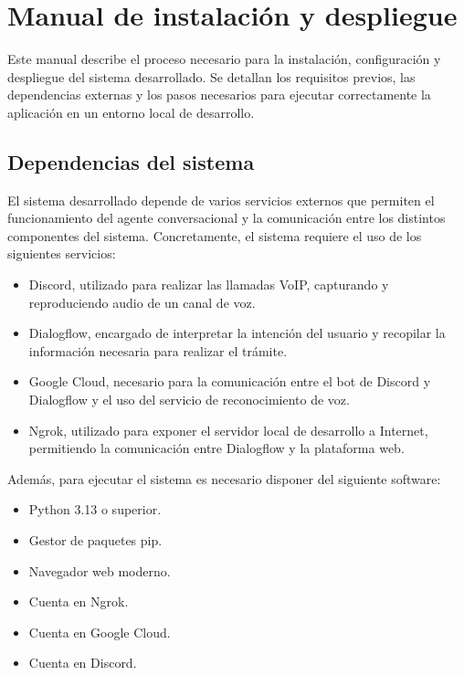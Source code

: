 \section{Manual de instalación y despliegue}

    Este manual describe el proceso necesario para la instalación, configuración y despliegue del sistema desarrollado. 
    Se detallan los requisitos previos, las dependencias externas y los pasos necesarios para ejecutar correctamente la aplicación en un entorno local de desarrollo. 

    \subsection{Dependencias del sistema}
        El sistema desarrollado depende de varios servicios externos que permiten el funcionamiento del agente conversacional y la comunicación entre los distintos componentes del sistema. 
        Concretamente, el sistema requiere el uso de los siguientes servicios: 
        \begin{itemize}
            \item Discord, utilizado para realizar las llamadas VoIP, capturando y reproduciendo audio de un canal de voz.
            \item Dialogflow, encargado de interpretar la intención del usuario y recopilar la información necesaria para realizar el trámite. 
            \item Google Cloud, necesario para la comunicación entre el bot de Discord y Dialogflow y el uso del servicio de reconocimiento de voz.  
            \item Ngrok, utilizado para exponer el servidor local de desarrollo a Internet, permitiendo la comunicación entre Dialogflow y la plataforma web.
        \end{itemize}
        
        Además, para ejecutar el sistema es necesario disponer del siguiente software: 
        \begin{itemize}
            \item Python 3.13 o superior.
            \item Gestor de paquetes pip.
            \item Navegador web moderno.
            \item Cuenta en Ngrok.
            \item Cuenta en Google Cloud.
            \item Cuenta en Discord.
        \end{itemize}

